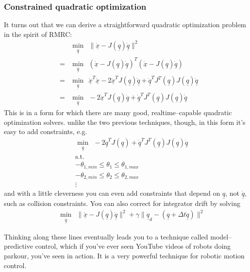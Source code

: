 \documentclass[]{article}
\begin{document}
\subsubsection{Constrained quadratic optimization}
It turns out that we can derive a straightforward quadratic optimization problem in the spirit of RMRC:
\begin{eqnarray}
&&\min_{\dot{\underline{q}}} \ \ \|\dot{\underline{x}} - J(\underline{q})\dot{\underline{q}}\|^{2} \nonumber \\
& = & \min_{\dot{\underline{q}}}\ \ \left( \dot{\underline{x}} - J(\underline{q})\dot{\underline{q}} \right)^{T}\left( \dot{\underline{x}} - J(\underline{q})\dot{\underline{q}} \right) \nonumber \\
& = & \min_{\dot{\underline{q}}}\ \ \dot{\underline{x}}^{T}\dot{\underline{x}} - 2\dot{\underline{x}}^{T}J(\underline{q})\dot{\underline{q}} + \dot{\underline{q}}^{T}J^{T}(\underline{q})J(\underline{q})\dot{\underline{q}} \nonumber \\
& = & \min_{\dot{\underline{q}}}\ \ -2\dot{\underline{x}}^{T}J(\underline{q})\dot{\underline{q}} + \dot{\underline{q}}^{T}J^{T}(\underline{q})J(\underline{q})\dot{\underline{q}} \nonumber
\end{eqnarray}
This is in a form for which there are many good, realtime--capable quadratic optimization solvers. unlike the two previous techniques, though, in this form it's easy to add constraints, e.g.
\begin{eqnarray}
&& \min_{\dot{\underline{q}}}\ \ -2\dot{\underline{q}}^{T}J(\underline{q}) + \dot{\underline{q}}^{T}J^{T}(\underline{q})J(\underline{q})\dot{\underline{q}} \nonumber \\
&&\text{s.t.} \nonumber \\
&&-\theta_{1,min} \le \theta_{1} \le \theta_{1,max} \nonumber \\
&&-\theta_{2,min} \le \theta_{2} \le \theta_{2,max} \nonumber \\
&&\vdots \nonumber
\end{eqnarray}
and with a little cleverness you can even add constraints that depend on $\underline{q}$, not $\dot{\underline{q}}$, such as collision constraints. You can also correct for integrator drift by solving
\begin{eqnarray}
&& \min_{\dot{\underline{q}}} \ \ \|\dot{\underline{x}} - J(\underline{q})\dot{\underline{q}}\|^{2} + \gamma \| \underline{q}_{d} - \left(\underline{q} + \Delta t \dot{\underline{q}} \right) \| ^{2} \nonumber 
\end{eqnarray}

Thinking along these lines eventually leads you to a technique called model--predictive control, which if you've ever seen YouTube videos of robots doing parkour, you've seen in action. It is a very powerful technique for robotic motion control.
\end{document}

